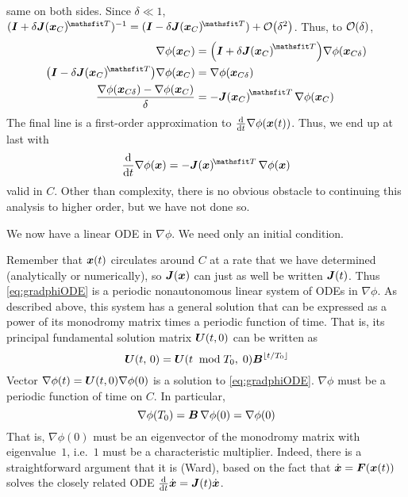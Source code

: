 same on both sides. Since $\delta\ll1$,  
$(\I+\delta\vb{J}(\vb{x}_{C})^{\T})^{-1}
=(\I-\delta\vb{J}(\vb{x}_{C})^{\T})+\order{\delta^2}$. 
Thus, to $\order{\delta}$,
\begin{equation}
\begin{aligned}
{\nabla}\phi(\vb{x}_{C})&=\qty(\I+\delta\vb{J}{(\vb{x}_{C})}^{\T})
{\nabla}\phi(\vb{x}_{C\delta})\\
\qty(\I-\delta \vb{J}(\vb{x}_{C})^{\T})
{\nabla}\phi(\vb{x}_{C})&={\nabla}\phi(\vb{x}_{C\delta})\\
\frac{{\nabla}\phi(\vb{x}_{C\delta})-{\nabla}\phi(\vb{x}_{C})}{\delta}
&=-\vb{J}{(\vb{x}_{C})}^{\T}\,{\nabla}\phi(\vb{x}_{C})
\end{aligned}
\end{equation}
The final line is a first-order approximation to 
$\dv{t} \nabla\phi(\vb{x}(t))$. Thus, we end up at last with 
\begin{equation}\label{eq:gradphiODE}
\dv{t} \nabla\phi(\vb{x})
=-\vb{J}(\vb{x})^{\T}\,\nabla\phi(\vb{x})
\end{equation}
valid in $C$. Other than complexity, there is no obvious obstacle to
continuing this analysis to higher order, but we have not done so. 

We now have a linear ODE in ${\nabla}\phi$. We need only an
initial condition. 

Remember that $\vb{x}(t)$ circulates around $C$ at a rate that we have
determined (analytically or numerically), so $\vb{J}(\vb{x})$ can just as well
be written $\vb{J}(t)$. Thus \eqref{eq:gradphiODE} is a periodic nonautonomous linear
system of ODEs in ${\nabla}\phi$. As described above, this
system has a general solution that can be expressed as a power of its
monodromy matrix times a periodic function of time. That is, its
principal fundamental solution matrix $\vb{U}(t,0)$ can be written as 
\begin{equation}
\vb{U}(t,\,0)=\vb{U}(t\;\;\text{mod}\; T_0,\;0)\vb{B}^{\lfloor t/{T}_0\rfloor}
\end{equation}
Vector ${\nabla}\phi(t)=\vb{U}(t, 0){\nabla}\phi(0)$ 
is a solution to \eqref{eq:gradphiODE}. ${\nabla}\phi$ must be a periodic function of
time on $C$. In particular, 
\begin{equation}
\nabla\phi(T_0)=\vb{B}\,\nabla\phi(0)={\nabla}\phi(0)
\end{equation}
That is, ${\nabla}\phi(0)$ must be an eigenvector of
the monodromy matrix with eigenvalue~$1$, i.e.~$1$ must be a
characteristic multiplier. Indeed, there is a straightforward
argument that it is (Ward), based on the fact that
$\dot{\vb{x}}=\vb{F}(\vb{x}(t))$ solves the closely related ODE
$\dv{t} \dot{\vb{x}}=\vb{J}(t)\dot{\vb{x}}$.






